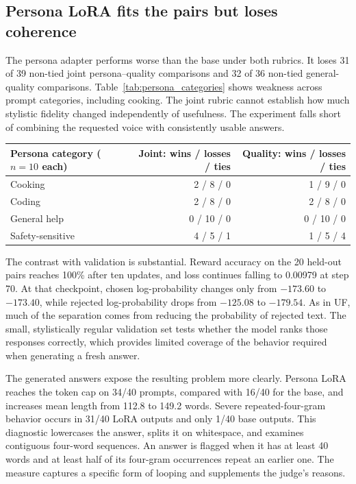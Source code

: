 \documentclass[10pt,a4paper]{article}
\begin{document}
\newpage
\subsection{Persona LoRA fits the pairs but loses coherence}
The persona adapter performs worse than the base under both rubrics. It loses 31 of 39 non-tied joint persona--quality comparisons and 32 of 36 non-tied general-quality comparisons. Table~\ref{tab:persona_categories} shows weakness across prompt categories, including cooking. The joint rubric cannot establish how much stylistic fidelity changed independently of usefulness. The experiment falls short of combining the requested voice with consistently usable answers.

\begin{center}\small
\begin{tabular}{@{}lrr@{}}\toprule
Persona category ($n=10$ each) & Joint: wins / losses / ties & Quality: wins / losses / ties\\\midrule
Cooking & 2 / 8 / 0 & 1 / 9 / 0\\
Coding & 2 / 8 / 0 & 2 / 8 / 0\\
General help & 0 / 10 / 0 & 0 / 10 / 0\\
Safety-sensitive & 4 / 5 / 1 & 1 / 5 / 4\\\bottomrule
\end{tabular}
\label{tab:persona_categories}
\end{center}

The contrast with validation is substantial. Reward accuracy on the 20 held-out pairs reaches 100\% after ten updates, and loss continues falling to 0.00979 at step 70. At that checkpoint, chosen log-probability changes only from $-173.60$ to $-173.40$, while rejected log-probability drops from $-125.08$ to $-179.54$. As in UF, much of the separation comes from reducing the probability of rejected text. The small, stylistically regular validation set tests whether the model ranks those responses correctly, which provides limited coverage of the behavior required when generating a fresh answer.

The generated answers expose the resulting problem more clearly. Persona LoRA reaches the token cap on 34/40 prompts, compared with 16/40 for the base, and increases mean length from 112.8 to 149.2 words. Severe repeated-four-gram behavior occurs in 31/40 LoRA outputs and only 1/40 base outputs. This diagnostic lowercases the answer, splits it on whitespace, and examines contiguous four-word sequences. An answer is flagged when it has at least 40 words and at least half of its four-gram occurrences repeat an earlier one. The measure captures a specific form of looping and supplements the judge's reasons.
\end{document}
